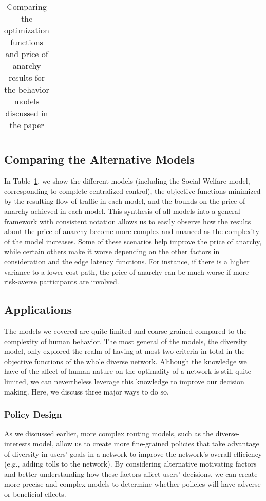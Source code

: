 \begin{table}[h]
\begin{center}
\begin{tabular}{|p{2cm}| p{6cm} | p{7cm}|}
\hline
\end{tabular}
\end{center}
    \caption{Comparing the optimization functions and price of anarchy results for the behavior models discussed in the paper}
    \label{tab:comparison}
\end{table}

\subsection{Comparing the Alternative Models}
In Table~\ref{tab:comparison}, we show the different models (including the Social Welfare model, corresponding to complete centralized control), the objective functions minimized 
by the resulting flow of traffic in each model, and the bounds on the price of anarchy achieved in each model. This synthesis of all models into a general framework with consistent notation allows us to easily observe how the results about the price of anarchy become more complex and nuanced as the complexity of the model increases. Some of these scenarios help improve the price of anarchy, while certain others make it worse depending on the other factors in
consideration and the edge latency functions. For instance, if there is a higher variance to a lower cost path, the price of anarchy can be much worse if more risk-averse participants are involved.

\subsection{Applications}
The models we covered are quite limited and coarse-grained compared to the complexity of human behavior. The most general of the models, the diversity model, only explored the realm of having at most two criteria in total in the objective functions of the whole diverse network.
Although the knowledge we have of the affect of human nature on the optimality of a network is still quite limited, we can nevertheless leverage this knowledge to improve our decision making. Here, we discuss three major ways to do so.

\subsubsection{Policy Design}
As we discussed earlier, more complex routing models, such as the diverse-interests model, allow us to create more fine-grained policies that take advantage of diversity in users' goals in a network to improve the network's overall efficiency (e.g., adding tolls to the network).
By considering alternative motivating factors and better understanding how these factors affect users' decisions, we can create more precise and complex models to determine whether policies will have adverse or beneficial effects.

